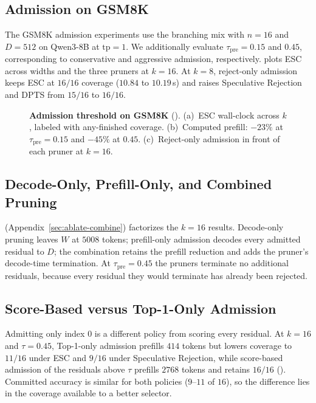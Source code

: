 \subsection{Admission on GSM8K}
\label{sec:eval-prefill}

The GSM8K admission experiments use the branching mix with $n{=}16$ and $D{=}512$ on Qwen3-8B at $\mathrm{tp}{=}1$.
We additionally evaluate $\tau_{\mathrm{pre}}{=}0.15$ and $0.45$, corresponding to conservative and aggressive admission, respectively.
 plots ESC across widths and the three pruners at $k{=}16$.
At $k{=}8$, reject-only admission keeps ESC at $16/16$ coverage ($10.84$ to $10.19$\,s) and raises Speculative Rejection and DPTS from $15/16$ to $16/16$.

\begin{figure}[t]
\centering
\resizebox{\textwidth}{!}{}
\caption{\textbf{Admission threshold on GSM8K} ().
(a)~ESC wall-clock across $k$, labeled with any-finished coverage.
(b)~Computed prefill: $-23\%$ at $\tau_{\mathrm{pre}}{=}0.15$ and $-45\%$ at $0.45$.
(c)~Reject-only admission in front of each pruner at $k{=}16$.}
\label{fig:eval-admit}
\end{figure}

\subsection{Decode-Only, Prefill-Only, and Combined Pruning}
\label{sec:eval-ablate}

 (Appendix~\ref{sec:ablate-combine}) factorizes the $k{=}16$ results.
Decode-only pruning leaves $W$ at $5008$ tokens; prefill-only admission decodes every admitted residual to $D$; the combination retains the prefill reduction and adds the pruner's decode-time termination.
At $\tau_{\mathrm{pre}}{=}0.45$ the pruners terminate no additional residuals, because every residual they would terminate has already been rejected.

\subsection{Score-Based versus Top-1-Only Admission}
\label{sec:eval-wide}

Admitting only index $0$ is a different policy from scoring every residual.
At $k{=}16$ and $\tau{=}0.45$, Top-1-only admission prefills $414$ tokens but lowers coverage to $11/16$ under ESC and $9/16$ under Speculative Rejection, while score-based admission of the residuals above $\tau$ prefills $2768$ tokens and retains $16/16$ ().
Committed accuracy is similar for both policies ($9$--$11$ of $16$), so the difference lies in the coverage available to a better selector.

